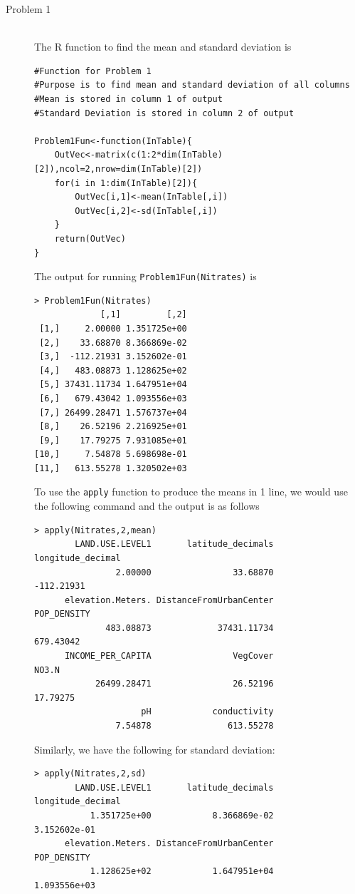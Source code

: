 \documentclass[10pt]{article}
\begin{document}
\begin{description}
\item[Problem 1]\hfill\\
The R function to find the mean and standard deviation is
\begin{lstlisting}[frame=trBL]
#Function for Problem 1
#Purpose is to find mean and standard deviation of all columns
#Mean is stored in column 1 of output
#Standard Deviation is stored in column 2 of output

Problem1Fun<-function(InTable){
	OutVec<-matrix(c(1:2*dim(InTable)[2]),ncol=2,nrow=dim(InTable)[2])
	for(i in 1:dim(InTable)[2]){
		OutVec[i,1]<-mean(InTable[,i])
		OutVec[i,2]<-sd(InTable[,i])
	}
	return(OutVec)
}
\end{lstlisting}
The output for running \verb+Problem1Fun(Nitrates)+ is
\begin{lstlisting}[frame=trBL]
> Problem1Fun(Nitrates)
             [,1]         [,2]
 [1,]     2.00000 1.351725e+00
 [2,]    33.68870 8.366869e-02
 [3,]  -112.21931 3.152602e-01
 [4,]   483.08873 1.128625e+02
 [5,] 37431.11734 1.647951e+04
 [6,]   679.43042 1.093556e+03
 [7,] 26499.28471 1.576737e+04
 [8,]    26.52196 2.216925e+01
 [9,]    17.79275 7.931085e+01
[10,]     7.54878 5.698698e-01
[11,]   613.55278 1.320502e+03
\end{lstlisting}
To use the \verb+apply+ function to produce the means in 1 line, we would use the following command and the output is as follows
\begin{lstlisting}[frame=trBL]
> apply(Nitrates,2,mean)
        LAND.USE.LEVEL1       latitude_decimals       longitude_decimal 
                2.00000                33.68870              -112.21931 
      elevation.Meters. DistanceFromUrbanCenter             POP_DENSITY 
              483.08873             37431.11734               679.43042 
      INCOME_PER_CAPITA                VegCover                   NO3.N 
            26499.28471                26.52196                17.79275 
                     pH            conductivity 
                7.54878               613.55278 
\end{lstlisting}
Similarly, we have the following for standard deviation:
\begin{lstlisting}[frame=trBL]
> apply(Nitrates,2,sd)
        LAND.USE.LEVEL1       latitude_decimals       longitude_decimal 
           1.351725e+00            8.366869e-02            3.152602e-01 
      elevation.Meters. DistanceFromUrbanCenter             POP_DENSITY 
           1.128625e+02            1.647951e+04            1.093556e+03 

\end{lstlisting}
\end{description}
\end{document}

